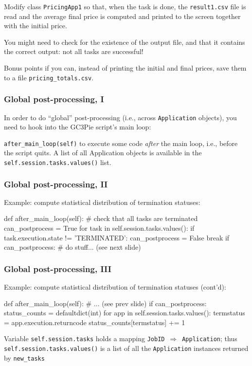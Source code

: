 \documentclass[english,serif,mathserif,xcolor=pdftex,dvipsnames,table]{beamer}
\begin{document}
\begin{frame}
  \begin{exercise*}[10.F]
    Modify class \texttt{PricingApp1} so that, when the task is done, the
    \texttt{result1.csv} file is read and the average final price is computed
    and printed to the screen together with the initial price.

    \+ You might need to check for the existence of the output file, and that it
    contains the correct output: not all tasks are successful!
  \end{exercise*}

  \begin{exercise*}[10.G]
    Bonus points if you can, instead of printing the initial and final prices,
    save them to a file \texttt{pricing\_totals.csv}.
  \end{exercise*}
\end{frame}


\begin{frame}
  \frametitle{Global post-processing, I}
In order to do ``global'' post-processing (i.e., across \texttt{Application}
objects), you need to hook into the GC3Pie script's main loop:

\+
\begin{describe}{\lstinline|after_main_loop(self)|}
  to execute some code \emph{after} the main loop, i.e., before the script
  quits. A list of all Application objects is available in the
  \lstinline|self.session.tasks.values()| list.
\end{describe}
\end{frame}


\begin{frame}[fragile]
  \frametitle{Global post-processing, II}
  Example: compute statistical distribution of termination statuses:

  \begin{python}
def after_main_loop(self):
  # check that all tasks are terminated
  can_postprocess = True
  for task in self.session.tasks.values():
    if task.execution.state != 'TERMINATED':
      can_postprocess = False
      break
  if can_postprocess:
    # do stuff... (see next slide)
  \end{python}
\end{frame}


\begin{frame}[fragile]
  \frametitle{Global post-processing, III}
  Example: compute statistical distribution of termination statuses (cont'd):

  \begin{python}
def after_main_loop(self):
  # ... (see prev slide)
  if can_postprocess:
    status_counts = defaultdict(int)
    for app in self.session.tasks.values():
      termstatus = app.execution.returncode
      status_counts[termstatus] += 1
  \end{python}

  \+\small Variable \lstinline|self.session.tasks| holds a mapping
  \lstinline|JobID|~$\Rightarrow$~\lstinline|Application|; thus
  \lstinline|self.session.tasks.values()| is a list of all the
  \texttt{Application} instances returned by \lstinline|new_tasks|
\end{frame}
\end{document}

